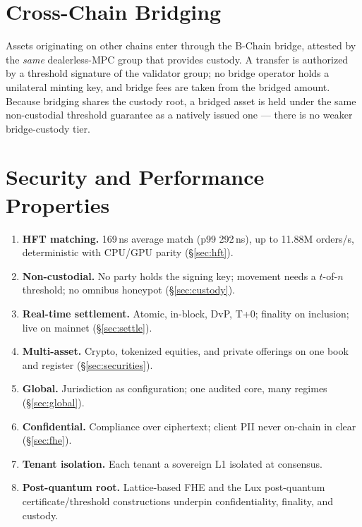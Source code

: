 \documentclass[11pt,a4paper]{article}
\begin{document}
\section{Cross-Chain Bridging}
\label{sec:bridge}

Assets originating on other chains enter through the B-Chain bridge, attested
by the \emph{same} dealerless-MPC group that provides custody. A transfer is
authorized by a threshold signature of the validator group; no bridge operator
holds a unilateral minting key, and bridge fees are taken from the bridged
amount. Because bridging shares the custody root, a bridged asset is held under
the same non-custodial threshold guarantee as a natively issued one --- there
is no weaker bridge-custody tier.

\section{Security and Performance Properties}

\begin{enumerate}[leftmargin=1.6em]
  \item \textbf{HFT matching.} 169\,ns average match (p99 292\,ns), up to
        11.88M orders/s, deterministic with CPU/GPU parity (\S\ref{sec:hft}).
  \item \textbf{Non-custodial.} No party holds the signing key; movement
        needs a $t$-of-$n$ threshold; no omnibus honeypot (\S\ref{sec:custody}).
  \item \textbf{Real-time settlement.} Atomic, in-block, DvP, T+0; finality on
        inclusion; live on mainnet (\S\ref{sec:settle}).
  \item \textbf{Multi-asset.} Crypto, tokenized equities, and private
        offerings on one book and register (\S\ref{sec:securities}).
  \item \textbf{Global.} Jurisdiction as configuration; one audited core, many
        regimes (\S\ref{sec:global}).
  \item \textbf{Confidential.} Compliance over ciphertext; client PII never
        on-chain in clear (\S\ref{sec:fhe}).
  \item \textbf{Tenant isolation.} Each tenant a sovereign L1 isolated at
        consensus.
  \item \textbf{Post-quantum root.} Lattice-based FHE and the Lux
        post-quantum certificate/threshold constructions underpin
        confidentiality, finality, and custody.
\end{enumerate}
\end{document}
